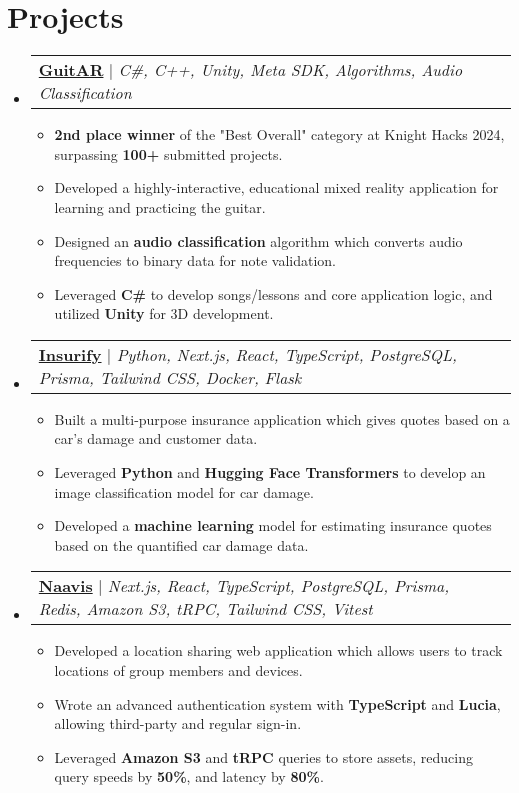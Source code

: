 \documentclass[letterpaper,11pt]{article}
\makeatletter
\newcommand{\resumeItem}[1]{
  \item\small{
    {#1 \vspace{-2pt}}
  }
}
\newcommand{\resumeProjectHeading}[2]{
    \item
    \begin{tabular*}{0.97\textwidth}{l@{\extracolsep{\fill}}r}
      \small#1\\
    \end{tabular*}\vspace{-7pt}
}
\newcommand{\resumeSubHeadingListStart}{\begin{itemize}[leftmargin=0.15in, label={}]}
\newcommand{\resumeSubHeadingListEnd}{\end{itemize}}
\newcommand{\resumeItemListStart}{\begin{itemize}}
\newcommand{\resumeItemListEnd}{\end{itemize}\vspace{-5pt}}
\makeatother
\begin{document}
\section{Projects}
    \resumeSubHeadingListStart
        \resumeProjectHeading
        {\textbf{\href{https://devpost.com/software/guitar-o3gw19}{GuitAR}} $|$ \emph{C\#, C++, Unity, Meta SDK, Algorithms, Audio Classification }}{June 2021 -- Present}
        \resumeItemListStart
          \resumeItem{\textbf{2nd place winner} of the "Best Overall" category at Knight Hacks 2024, surpassing \textbf{100+} submitted projects.}
          \resumeItem{Developed a highly-interactive, educational mixed reality application for learning and practicing the guitar.}
          \resumeItem{Designed an \textbf{audio classification} algorithm which converts audio frequencies to binary data for note validation.}
          \resumeItem{Leveraged \textbf{C\#} to develop songs/lessons and core application logic, and utilized \textbf{Unity} for 3D development.}
        \resumeItemListEnd
        \resumeProjectHeading
            {\textbf{\href{https://devpost.com/software/insurify-zj2dh4}{Insurify}} $|$ \emph{Python, Next.js, React, TypeScript, PostgreSQL, Prisma, Tailwind CSS, Docker, Flask}}{June 2021 -- Present}
          \resumeItemListStart
            \resumeItem{Built a multi-purpose insurance application which gives quotes based on a car's damage and customer data.}
            \resumeItem{Leveraged \textbf{Python} and \textbf{Hugging Face Transformers} to develop an image classification model for car damage.}
            \resumeItem{Developed a \textbf{machine learning} model for estimating insurance quotes based on the quantified car damage data.}
          \resumeItemListEnd
      \resumeProjectHeading
          {\textbf{\href{https://github.com/naavis-app/app}{Naavis}} $|$ \emph{Next.js, React, TypeScript, PostgreSQL, Prisma, Redis, Amazon S3, tRPC, Tailwind CSS, Vitest}}{June 2021 -- Present}
          \resumeItemListStart
            \resumeItem{Developed a location sharing web application which allows users to track locations of group members and devices.}
            \resumeItem{Wrote an advanced authentication system with \textbf{TypeScript} and \textbf{Lucia}, allowing third-party and regular sign-in.}
            \resumeItem{Leveraged \textbf{Amazon S3} and \textbf{tRPC} queries to store assets, reducing query speeds by \textbf{50\%}, and latency by \textbf{80\%}.}
          \resumeItemListEnd
    \resumeSubHeadingListEnd
%

\end{document}
